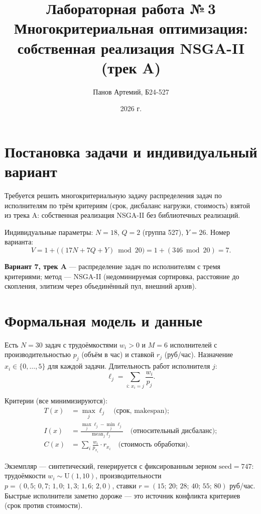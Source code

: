 \documentclass[12pt,a4paper]{article}
\title{Лабораторная работа №\,3\\ \large Многокритериальная оптимизация: собственная реализация NSGA-II (трек A)}
\author{Панов Артемий, Б24-527}
\date{2026 г.}
\begin{document}
\maketitle

\section{Постановка задачи и индивидуальный вариант}

Требуется решить многокритериальную задачу распределения задач по
исполнителям по трём критериям (срок, дисбаланс нагрузки, стоимость)
взятой из трека A: собственная реализация NSGA-II без библиотечных
реализаций.

Индивидуальные параметры: $N = 18$, $Q = 2$ (группа 527), $Y = 26$. Номер
варианта:
\[
V = 1 + \big((17N + 7Q + Y) \bmod 20\big) = 1 + (346 \bmod 20) = 7.
\]

\textbf{Вариант 7, трек A} --- распределение задач по исполнителям с
тремя критериями; метод --- NSGA-II (недоминируемая сортировка, расстояние
до скопления, элитизм через объединённый пул, внешний архив).

\section{Формальная модель и данные}

Есть $N = 30$ задач с трудоёмкостями $w_i > 0$ и $M = 6$ исполнителей с
производительностью $p_j$ (объём в час) и ставкой $r_j$ (руб/час).
Назначение $x_i \in \{0, \dots, 5\}$ для каждой задачи. Длительность работ
исполнителя $j$:
\[
\ell_j = \sum_{i:\,x_i=j} \frac{w_i}{p_j}.
\]

Критерии (все минимизируются):
\begin{align}
T(x) &= \max_j \ell_j \quad \text{(срок, makespan)}; \\
I(x) &= \frac{\max_j \ell_j - \min_j \ell_j}{\mathrm{mean}_j \ell_j}
\quad \text{(относительный дисбаланс)}; \\
C(x) &= \sum_{i} \frac{w_i}{p_{x_i}} \cdot r_{x_i}
\quad \text{(стоимость обработки)}.
\end{align}

Экземпляр --- синтетический, генерируется с фиксированным зерном
$\text{seed} = 747$: трудоёмкости $w_i \sim \mathrm{U}(1, 10)$,
производительности $p = (0{,}5;\,0{,}7;\,1{,}0;\,1{,}3;\,1{,}6;\,2{,}0)$,
ставки $r = (15;\,20;\,28;\,40;\,55;\,80)$ руб/час. Быстрые исполнители
заметно дороже --- это источник конфликта критериев (срок против
стоимости).
\end{document}
